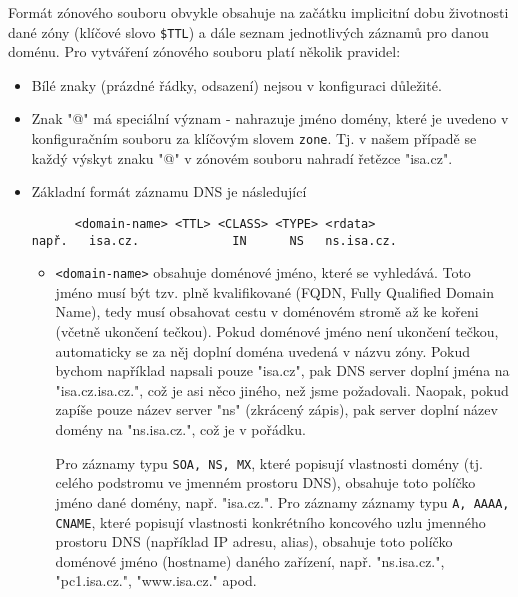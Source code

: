 Formát zónového souboru obvykle obsahuje na začátku implicitní dobu životnosti dané zóny (klíčové slovo {\tt \$TTL}) a dále seznam jednotlivých záznamů pro danou doménu. Pro vytváření zónového souboru platí několik pravidel:
\begin{itemize}
  \item Bílé znaky (prázdné řádky, odsazení) nejsou v konfiguraci důležité.
  \item Znak "@" má speciální význam - nahrazuje jméno domény, které je uvedeno v konfiguračním souboru za klíčovým slovem {\tt zone}. Tj. v našem případě se každý výskyt znaku "@" v zónovém souboru nahradí řetězce "isa.cz".
  \item Základní formát záznamu DNS je následující
\begin{verbatim}
      <domain-name> <TTL> <CLASS> <TYPE> <rdata>
např.   isa.cz.             IN      NS   ns.isa.cz.
\end{verbatim}
  \begin{itemize}
    \item \verb|<domain-name>| obsahuje doménové jméno, které se vyhledává. Toto jméno musí být tzv. plně kvalifikované (FQDN, Fully Qualified Domain Name), tedy musí obsahovat cestu v doménovém stromě až ke kořeni (včetně ukončení tečkou). Pokud doménové jméno není ukončení tečkou, automaticky se za něj doplní doména uvedená v názvu zóny. Pokud bychom například napsali pouze "isa.cz", pak DNS server doplní jména na "isa.cz.isa.cz.", což je asi něco jiného, než jsme požadovali. Naopak, pokud zapíše pouze název server "ns" (zkrácený zápis), pak server doplní název domény na "ns.isa.cz.", což je v pořádku.
    
    Pro záznamy typu {\tt SOA, NS, MX}, které popisují vlastnosti domény (tj. celého podstromu ve jmenném prostoru DNS), obsahuje toto políčko jméno dané domény, např. "isa.cz.". Pro záznamy záznamy typu {\tt A, AAAA, CNAME}, které popisují vlastnosti konkrétního koncového uzlu jmenného prostoru DNS (například IP adresu, alias), obsahuje toto políčko doménové jméno (hostname) daného zařízení, např. "ns.isa.cz.", "pc1.isa.cz.", "www.isa.cz." apod. 
    

\end{itemize}
\end{itemize}
